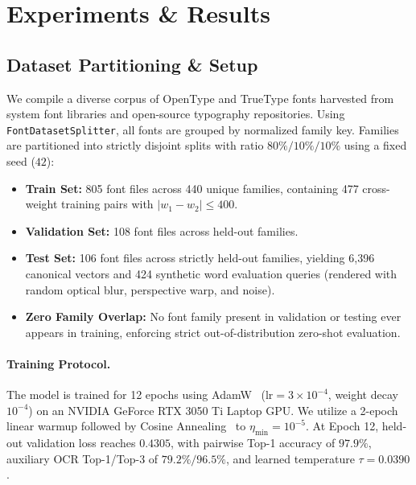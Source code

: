 \documentclass[10pt,twocolumn,letterpaper]{article}
\begin{document}
\section{Experiments \& Results}

\subsection{Dataset Partitioning \& Setup}
We compile a diverse corpus of OpenType and TrueType fonts harvested from system font libraries and open-source typography repositories. Using \texttt{FontDatasetSplitter}, all fonts are grouped by normalized family key. Families are partitioned into strictly disjoint splits with ratio $80\% / 10\% / 10\%$ using a fixed seed ($42$):
\begin{itemize}
    \item \textbf{Train Set:} 805 font files across 440 unique families, containing 477 cross-weight training pairs with $|w_1 - w_2| \le 400$.
    \item \textbf{Validation Set:} 108 font files across held-out families.
    \item \textbf{Test Set:} 106 font files across strictly held-out families, yielding 6,396 canonical vectors and 424 synthetic word evaluation queries (rendered with random optical blur, perspective warp, and noise).
    \item \textbf{Zero Family Overlap:} No font family present in validation or testing ever appears in training, enforcing strict out-of-distribution zero-shot evaluation.
\end{itemize}

\paragraph{Training Protocol.}
The model is trained for 12 epochs using AdamW~\cite{loshchilov2018decoupled} ($\text{lr} = 3 \times 10^{-4}$, weight decay $10^{-4}$) on an NVIDIA GeForce RTX 3050 Ti Laptop GPU. We utilize a 2-epoch linear warmup followed by Cosine Annealing~\cite{loshchilov2016sgdr} to $\eta_{\min} = 10^{-5}$. At Epoch 12, held-out validation loss reaches $0.4305$, with pairwise Top-1 accuracy of $97.9\%$, auxiliary OCR Top-1/Top-3 of $79.2\% / 96.5\%$, and learned temperature $\tau = 0.0390$.
\end{document}
